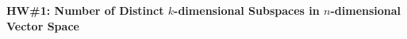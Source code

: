 \documentclass{article}
\newtheorem{lemma}[theorem]{Lemma}
\theoremstyle{definition}
\newtheorem*{notation}{Notation}
\newcommand{\F}{\mathbb{F}}
\newcommand{\GL}{\text{GL}}
\begin{document}
\begin{center}
	\huge\textbf{HW\#1: Number of Distinct $k$-dimensional Subspaces in $n$-dimensional Vector Space}\\
	\vspace{0.5em}
\end{center}

%
%
\end{document}
